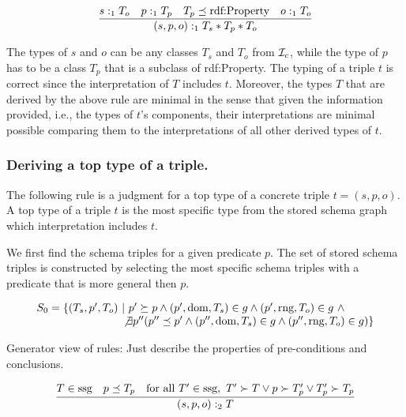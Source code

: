 \documentclass[runningheads]{llncs}
\begin{document}
\begin{equation}
\dfrac{s:_1T_o\quad p:_1T_p\quad T_p\preceq\/\text{rdf:Property}\quad o:_1T_o}
      {(s,p,o):_1T_s*T_p*T_o}
\end{equation}

The types of $s$ and $o$ can be any classes $T_s$ and $T_o$ from
${\cal I}_c$, while the type of $p$ has to be a class $T_p$ that is a
subclass of rdf:Property. The typing of a triple $t$ is correct since
the interpretation of $T$ includes $t$. Moreover, the types $T$ that
are derived by the above rule are minimal in the sense that given the
information provided, i.e., the types of $t$'s components, their
interpretations are minimal possible comparing them to the
interpretations of all other derived types of $t$.



\subsubsection{Deriving a top type of a triple.}

\noindent The following rule is a judgment for a top type of a
concrete triple $t=(s,p,o)$. A top type of a triple $t$ is the most
specific type from the stored schema graph which interpretation
includes $t$.

We first find the schema triples for a given predicate $p$. The set of
stored schema triples is constructed by selecting the most specific
schema triples with a predicate that is more general then $p$.

\begin{equation}
\begin{array}{l}
S_0 = \{(T_s,p',T_o)\ |\ p'\succeq\/p \land (p',\text{dom},T_s)\in\/g \land (p',\text{rng},T_o)\in\/g\ \land \\
\phantom{S = \{(T_s,p',T_o)\ |} \not\exists\/p''(p''\preceq\/p'\land(p'',\text{dom},T_s)\in\/g\land(p'',\text{rng},T_o)\in\/g)\}
\end{array}
\end{equation}

Generator view of rules: Just describe the properties of
pre-conditions and conclusions.

\begin{equation}
\dfrac{T\in\/\text{ssg}\quad p\preceq\/T_p\quad  
       \text{for all\ } T'\in\/\text{ssg},\ T'\succ\/T \lor p\succ\/T'_p\lor T'_p\succ\/T_p}
      {(s,p,o):_2\/T}
\end{equation}
\end{document}
